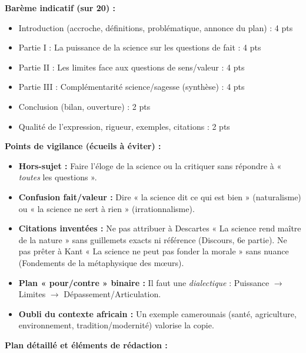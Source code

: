 \documentclass[11pt]{article}
\begin{document}
\begin{corrige}
\textbf{Barème indicatif (sur 20) :}
\begin{itemize}
\item Introduction (accroche, définitions, problématique, annonce du plan) : 4 pts
\item Partie I : La puissance de la science sur les questions de fait : 4 pts
\item Partie II : Les limites face aux questions de sens/valeur : 4 pts
\item Partie III : Complémentarité science/sagesse (synthèse) : 4 pts
\item Conclusion (bilan, ouverture) : 2 pts
\item Qualité de l'expression, rigueur, exemples, citations : 2 pts
\end{itemize}

\textbf{Points de vigilance (écueils à éviter) :}
\begin{itemize}
\item \textbf{Hors-sujet :} Faire l'éloge de la science ou la critiquer sans répondre à « \emph{toutes} les questions ».
\item \textbf{Confusion fait/valeur :} Dire « la science dit ce qui est bien » (naturalisme) ou « la science ne sert à rien » (irrationnalisme).
\item \textbf{Citations inventées :} Ne pas attribuer à Descartes « La science rend maître de la nature » sans guillemets exacts ni référence (Discours, 6e partie). Ne pas prêter à Kant « La science ne peut pas fonder la morale » sans nuance (Fondements de la métaphysique des mœurs).
\item \textbf{Plan « pour/contre » binaire :} Il faut une \emph{dialectique} : Puissance $\rightarrow$ Limites $\rightarrow$ Dépassement/Articulation.
\item \textbf{Oubli du contexte africain :} Un exemple camerounais (santé, agriculture, environnement, tradition/modernité) valorise la copie.
\end{itemize}

\textbf{Plan détaillé et éléments de rédaction :}


\end{corrige}
\end{document}
